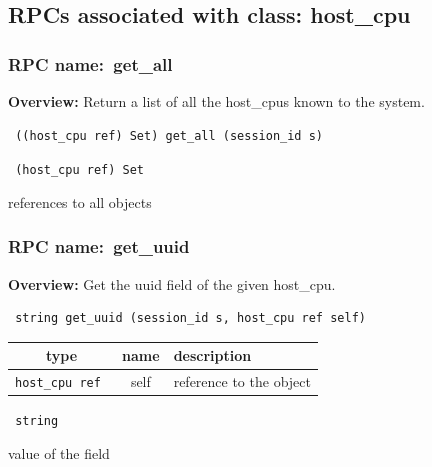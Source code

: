 \subsection{RPCs associated with class: host\_cpu}
\subsubsection{RPC name:~get\_all}

{\bf Overview:} 
Return a list of all the host\_cpus known to the system.

\begin{verbatim} ((host_cpu ref) Set) get_all (session_id s)\end{verbatim}


\vspace{0.3cm}

{\tt 
(host\_cpu ref) Set
}


references to all objects
\vspace{0.3cm}
\vspace{0.3cm}
\vspace{0.3cm}
\subsubsection{RPC name:~get\_uuid}

{\bf Overview:} 
Get the uuid field of the given host\_cpu.

\begin{verbatim} string get_uuid (session_id s, host_cpu ref self)\end{verbatim}



 
\vspace{0.3cm}
\begin{tabular}{|c|c|p{7cm}|}
 \hline
{\bf type} & {\bf name} & {\bf description} \\ \hline
{\tt host\_cpu ref } & self & reference to the object \\ \hline 

\end{tabular}

\vspace{0.3cm}

{\tt 
string
}


value of the field
\vspace{0.3cm}
\vspace{0.3cm}
\vspace{0.3cm}
